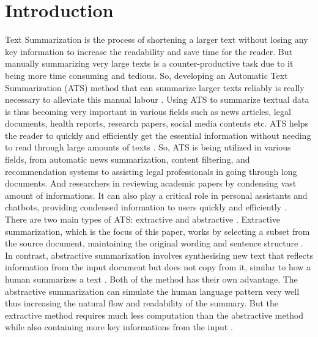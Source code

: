 \documentclass[acmlarge]{acmart}
\begin{document}
\section{Introduction}\label{sec:introduction}
Text Summarization is the process of shortening a larger text without losing any key information to increase the readability and save time for the reader. But manually summarizing very large texts is a counter-productive task due to it being more time consuming and tedious. So, developing an Automatic Text Summarization (ATS) method that can summarize larger texts reliably is really necessary to alleviate this manual labour \cite{Widyassari-2022-rev-ats-tech-met}. 
Using ATS to summarize textual data is thus becoming very important in various fields such as news articles, legal documents, health reports, research papers, social media contents etc. ATS helps the reader to quickly and efficiently get the essential information without needing to read through large amounts of texts \cite{wafaa-2021-summary-comprehensive-review}. So, ATS is being utilized in various fields, from automatic news summarization, content filtering, and recommendation systems to assisting legal professionals in going through long documents. And researchers in reviewing academic papers by condensing vast amount of informations. It can also play a critical role in personal assistants and chatbots, providing condensed information to users quickly and efficiently \cite{tas-2017-rev-text-sum-2}.\\

There are two main types of ATS: extractive and abstractive \cite{tas-2017-rev-text-sum-2}. Extractive summarization, which is the focus of this paper, works by selecting a subset from the source document, maintaining the original wording and sentence structure \cite{moratanch-2017-extractive-review}. In contrast, abstractive summarization involves synthesising new text that reflects information from the input document but does not copy from it, similar to how a human summarizes a text \cite{Moratanch-2016-abstractive-rev}. Both of the method has their own advantage. The abstractive summarization can simulate the human language pattern very well thus increasing the natural flow and readability of the summary. But the extractive method requires much less computation than the abstractive method while also containing more key informations from the input \cite{gupta-2010-extractive-rev}.\\ 
\end{document}
